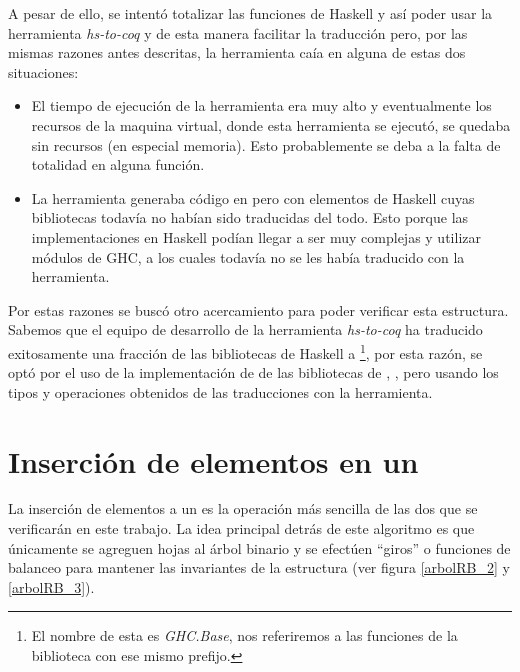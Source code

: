 A pesar de ello, se intent\'o totalizar las funciones de Haskell y así poder usar la herramienta 
\textit{hs-to-coq} y de esta manera facilitar la traducci\'on pero, por las mismas razones antes 
descritas, la herramienta caía en alguna de estas dos situaciones:

\begin{itemize}
    \item El tiempo de ejecuci\'on de la herramienta era muy alto y eventualmente los recursos de
    la maquina virtual, donde esta herramienta se ejecut\'o, se quedaba sin recursos (en
    especial memoria). Esto probablemente se deba a la falta de totalidad en alguna función.
    \item La herramienta generaba c\'odigo en {\coq} pero con elementos de Haskell cuyas bibliotecas
    todavía no habían sido traducidas del todo. Esto porque las implementaciones en Haskell pod\'ian
    llegar a ser muy complejas y utilizar módulos de GHC, a los cuales todav\'ia no se les hab\'ia
    traducido con la herramienta.
\end{itemize}{}

Por estas razones se busc\'o otro acercamiento para poder verificar esta estructura.
Sabemos que el equipo de desarrollo de la herramienta \textit{hs-to-coq} ha traducido exitosamente 
una fracci\'on de las bibliotecas de Haskell a {\coq}\footnote{El nombre de esta es 
\textit{GHC.Base}, nos referiremos a las funciones de la biblioteca con ese mismo prefijo.}, por 
esta raz\'on, se opt\'o por el uso de la implementación de {\arns} de las bibliotecas de {\coq}, 
\cite{MSetRBT}, pero usando los tipos y operaciones obtenidos de las traducciones con la herramienta.

\section{Inserción de elementos en un {\arn}}

La inserci\'on de elementos a un {\arn} es la operaci\'on m\'as sencilla de las dos que se
verificar\'an en este trabajo. La idea principal detrás de este algoritmo es que \'unicamente se 
agreguen hojas al \'arbol binario y se efectúen ``giros'' o funciones de balanceo para 
mantener las invariantes de la estructura (ver figura \ref{arbolRB_2} y \ref{arbolRB_3}).

